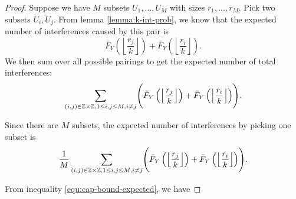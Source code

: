 \begin{proof}

    Suppose we have $M$ subsets $U_1,...,U_M$ with sizes $r_1,...,r_M$. Pick two subsets $U_i,U_j$. From lemma \ref{lemma:k-int-prob}, we know that the expected number of interferences caused by this pair is
    $$
    \bar{F}_Y\left(\left\lfloor \frac{r_j}{k} \right\rfloor\right) + \bar{F}_Y\left(\left\lfloor \frac{r_i}{k} \right\rfloor\right).
    $$
    We then sum over all possible pairings to get the expected number of total interferences:
    $$
    \sum_{(i,j) \in \mathbb{Z}\times\mathbb{Z}, 1 \le i,j \le M, i \ne j} \Biggl( \bar{F}_Y\left(\left\lfloor \frac{r_j}{k} \right\rfloor\right) + \bar{F}_Y\left(\left\lfloor \frac{r_i}{k} \right\rfloor\right) \Biggr).
    $$

\noindent Since there are $M$ subsets, the expected number of interferences by picking one subset is
    $$
    \frac{1}{M} \sum_{(i,j) \in \mathbb{Z}\times\mathbb{Z}, 1 \le i,j \le M, i \ne j}  \Biggl( \bar{F}_Y\left(\left\lfloor \frac{r_j}{k} \right\rfloor\right) + \bar{F}_Y\left(\left\lfloor \frac{r_i}{k} \right\rfloor\right) \Biggr).
    $$

\noindent From inequality \ref{equ:cap-bound-expected}, we have 


\end{proof}
